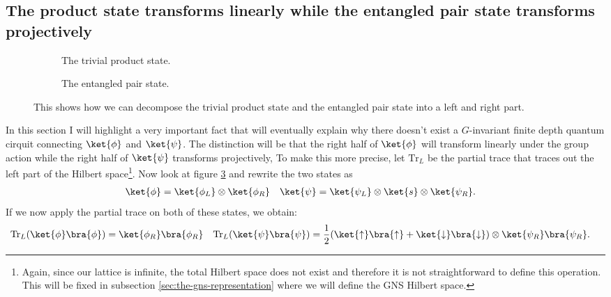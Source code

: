 \subsection{The product state transforms linearly while the entangled pair state transforms projectively}\label{sec:the-product-state-transforms-linearly-while-the-entangled-pair-state-transforms-projectively}
\begin{figure}
	\centering
	\begin{subfigure}{\textwidth}
		\centering
		
		\caption{The trivial product state.}
		\label{fig:TrivialProductStateTwoParts}
	\end{subfigure}
	\begin{subfigure}{\textwidth}
		\centering
		
		\caption{The entangled pair state.}
		\label{fig:FakeAKLT_State_TwoParts}
	\end{subfigure}
	\caption{This shows how we can decompose the trivial product state and the entangled pair state into a left and right part.}
	\label{fig:TheTwoHaldanePhasesTwoParts}
\end{figure}
In this section I will highlight a very important fact that will eventually explain why there doesn't exist a $G$-invariant finite depth quantum cirquit connecting $\ket{\phi}$ and $\ket{\psi}$. The distinction will be that the right half of $\ket{\phi}$ will transform linearly under the group action while the right half of $\ket{\psi}$ transforms projectively, To make this more precise, let $\textrm{Tr}_L$ be the partial trace that traces out the left part of the Hilbert space\footnote{Again, since our lattice is infinite, the total Hilbert space does not exist and therefore it is not straightforward to define this operation. This will be fixed in subsection \ref{sec:the-gns-representation} where we will define the GNS Hilbert space.}. Now look at figure \ref{fig:TheTwoHaldanePhasesTwoParts} and rewrite the two states as
\begin{align}
\ket{\phi}&=\ket{\phi_L}\otimes\ket{\phi_R}&\ket{\psi}&=\ket{\psi_L}\otimes\ket{s}\otimes\ket{\psi_R}.
\end{align}
If we now apply the partial trace on both of these states, we obtain:
\begin{align}
\textrm{Tr}_L(\ket{\phi}\bra{\phi})&=\ket{\phi_R}\bra{\phi_R}&\textrm{Tr}_L(\ket{\psi}\bra{\psi})&=\frac{1}{2}(\ket{\uparrow}\bra{\uparrow}+\ket{\downarrow}\bra{\downarrow})\otimes \ket{\psi_R}\bra{\psi_R}.
\end{align}
